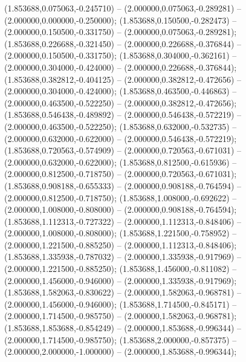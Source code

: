  (1.853688,0.075063,-0.245710) -- (2.000000,0.075063,-0.289281) -- (2.000000,0.000000,-0.250000);
 (1.853688,0.150500,-0.282473) -- (2.000000,0.150500,-0.331750) -- (2.000000,0.075063,-0.289281);
 (1.853688,0.226688,-0.321450) -- (2.000000,0.226688,-0.376844) -- (2.000000,0.150500,-0.331750);
 (1.853688,0.304000,-0.362161) -- (2.000000,0.304000,-0.424000) -- (2.000000,0.226688,-0.376844);
 (1.853688,0.382812,-0.404125) -- (2.000000,0.382812,-0.472656) -- (2.000000,0.304000,-0.424000);
 (1.853688,0.463500,-0.446863) -- (2.000000,0.463500,-0.522250) -- (2.000000,0.382812,-0.472656);
 (1.853688,0.546438,-0.489892) -- (2.000000,0.546438,-0.572219) -- (2.000000,0.463500,-0.522250);
 (1.853688,0.632000,-0.532735) -- (2.000000,0.632000,-0.622000) -- (2.000000,0.546438,-0.572219);
 (1.853688,0.720563,-0.574909) -- (2.000000,0.720563,-0.671031) -- (2.000000,0.632000,-0.622000);
 (1.853688,0.812500,-0.615936) -- (2.000000,0.812500,-0.718750) -- (2.000000,0.720563,-0.671031);
 (1.853688,0.908188,-0.655333) -- (2.000000,0.908188,-0.764594) -- (2.000000,0.812500,-0.718750);
 (1.853688,1.008000,-0.692622) -- (2.000000,1.008000,-0.808000) -- (2.000000,0.908188,-0.764594);
 (1.853688,1.112313,-0.727322) -- (2.000000,1.112313,-0.848406) -- (2.000000,1.008000,-0.808000);
 (1.853688,1.221500,-0.758952) -- (2.000000,1.221500,-0.885250) -- (2.000000,1.112313,-0.848406);
 (1.853688,1.335938,-0.787032) -- (2.000000,1.335938,-0.917969) -- (2.000000,1.221500,-0.885250);
 (1.853688,1.456000,-0.811082) -- (2.000000,1.456000,-0.946000) -- (2.000000,1.335938,-0.917969);
 (1.853688,1.582063,-0.830622) -- (2.000000,1.582063,-0.968781) -- (2.000000,1.456000,-0.946000);
 (1.853688,1.714500,-0.845171) -- (2.000000,1.714500,-0.985750) -- (2.000000,1.582063,-0.968781);
 (1.853688,1.853688,-0.854249) -- (2.000000,1.853688,-0.996344) -- (2.000000,1.714500,-0.985750);
 (1.853688,2.000000,-0.857375) -- (2.000000,2.000000,-1.000000) -- (2.000000,1.853688,-0.996344);
